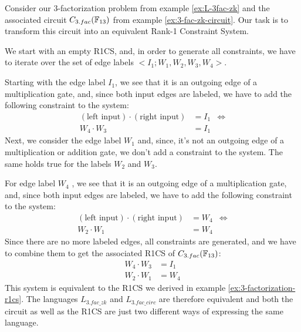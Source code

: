 \begin{example}[$3$-factorization] Consider our $3$-factorization problem from example \ref{ex:L-3fac-zk} and the associated circuit $C_{3.fac}(\mathbb{F}_{13})$ from example \ref{ex:3-fac-zk-circuit}. Our task is to transform this circuit into an equivalent Rank-1 Constraint System.
\begin{center}
\end{center}
We start with an empty R1CS, and, in order to generate all constraints, we have to iterate over the set of edge labels $<I_1;W_1,W_2,W_3,W_4>$.  

Starting with the edge label $I_1$, we see that it is an outgoing edge of a multiplication gate, and, since both input edges are labeled, we  have to add the following constraint to the system:
\begin{align*}
(\text{left input})\cdot (\text{right input})  &= I_1 & \Leftrightarrow\\
W_4\cdot W_3  &= I_1
\end{align*}
Next, we consider the edge label $W_1$ and, since, it's not an outgoing edge of a multiplication or addition gate, we don't add a constraint to the system. The same holds true for the labels $W_2$ and $W_3$. 

For edge label $W_4$ , we see that it is an outgoing edge of a multiplication gate, and, since both input edges are labeled, we have to add the following constraint to the system:
\begin{align*}
(\text{left input})\cdot (\text{right input})  &= W_4 & \Leftrightarrow\\
W_2\cdot W_1  &= W_4
\end{align*} 
Since there are no more labeled edges, all constraints are generated, and we have to combine them to get the associated R1CS of $C_{3.fac}(\mathbb{F}_{13})$: 
\begin{align*}
 W_4\cdot W_3 & = I_1\\
 W_2\cdot W_1 & = W_4
\end{align*}
This system is equivalent to the R1CS we derived in example \ref{ex:3-factorization-r1cs}. The languages $L_{3.fac\_zk}$ and $L_{3.fac\_circ}$ are therefore equivalent and both the circuit as well as the R1CS are just two different ways of expressing the same language.
\end{example}
